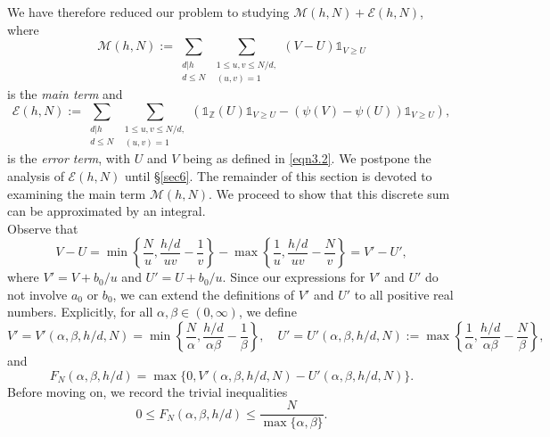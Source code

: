 \documentclass[12pt,reqno]{amsart}
\theoremstyle{definition}
\theoremstyle{remark}
\numberwithin{equation}{section}
\renewcommand{\geq}{\geqslant}
\renewcommand{\leq}{\leqslant}
\def \cE {\mathcal E}
\def \cM {\mathcal M}
\newcommand\1{\mathds{1}}
\begin{document}
We have therefore reduced our problem to studying $\cM(h,N) + \cE(h,N)$, where 
\begin{equation}\label{eqn3.3}
    \cM(h,N):=\sum_{\substack{d|h \\ d \leqslant N}} \sum_{\substack{1 \leq u,v \leq N/d,\\ (u,v) = 1}}(V-U)\1_{V \geq U}
\end{equation}
is the \emph{main term} and
\begin{equation}\label{eqn3.4}
    \cE(h,N):=\sum_{\substack{d|h \\ d \leqslant N}} \sum_{\substack{1 \leq u,v \leq N/d,\\ (u,v) = 1}}(\1_{\mathbb{Z}}(U)\1_{V \geq U} - ( \psi(V) - \psi(U))\1_{V \geq U}),
\end{equation}
is the \emph{error term}, with $U$ and $V$ being as defined in \eqref{eqn3.2}. We postpone the analysis of $\cE(h,N)$ until \S\ref{sec6}. The remainder of this section is devoted to examining the main term $\cM(h,N)$. We proceed to show that this discrete sum can be approximated by an integral.\\

Observe that
\begin{equation*}
    V-U=\min\left\{\frac{N}{u} ,  \frac{h/d}{uv} - \frac{1}{v} \right\} -  \max\left\{ \frac{1}{u}, \frac{h/d}{uv}-\frac{N}{v} \right\}  = V'- U',
\end{equation*}
where $V' = V + b_0/u$ and $U' = U + b_0/u$. Since our expressions for $V'$ and $U'$ do not involve $a_0$ or $b_0$, we can extend the definitions of $V'$ and $U'$ to all positive real numbers. Explicitly, for all $\alpha,\beta\in(0,\infty)$, we define
\begin{equation*}
    V'=V'(\alpha,\beta,h/d,N) = \min\left\{\frac{N}{\alpha} ,  \frac{h/d}{\alpha\beta} - \frac{1}{\beta} \right\},\quad U'=U'(\alpha,\beta,h/d,N) :=\max\left\{ \frac{1}{\alpha}, \frac{h/d}{\alpha\beta}-\frac{N}{\beta} \right\},
\end{equation*}
and
\begin{equation*}
    F_N(\alpha,\beta,h/d) = \max\{0,V'(\alpha,\beta,h/d,N) - U'(\alpha,\beta,h/d,N)\}.
\end{equation*}
Before moving on, we record the trivial inequalities
\begin{equation}\label{eqn3.5}
   0\leqslant  F_N(\alpha,\beta,h/d) \leqslant \frac{N}{\max\{\alpha,\beta\}}.
\end{equation}
\end{document}

